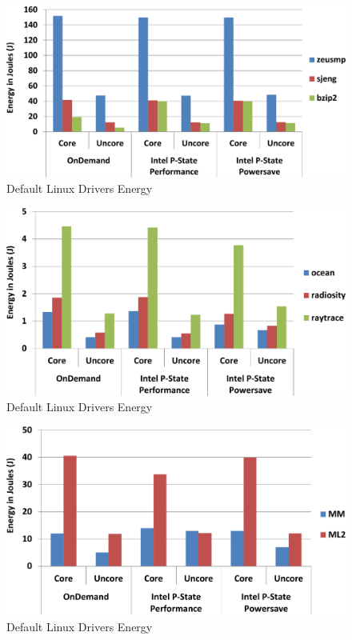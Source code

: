 \begin{figure}
  \begin{center}
\includegraphics[width=\linewidth]{figs/def-drivers-spec-crop.pdf}
  \end{center}
  \vspace{-0.1in}
  \caption{Default Linux Drivers Energy}
  \label{fig:sched-results}
\end{figure}

\begin{figure}
  \begin{center}
\includegraphics[width=\linewidth]{figs/def-drivers-splash-crop.pdf}
  \end{center}
  \vspace{-0.1in}
  \caption{Default Linux Drivers Energy}
  \label{fig:sched-results}
\end{figure}

\begin{figure}
  \begin{center}
\includegraphics[width=\linewidth]{figs/def-drivers-micro-crop.pdf}
  \end{center}
  \vspace{-0.1in}
  \caption{Default Linux Drivers Energy}
  \label{fig:sched-results}
\end{figure}


